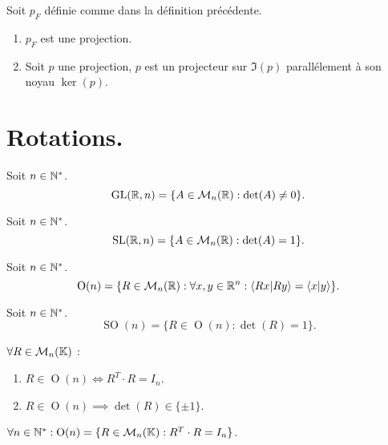 \begin{proposition}
    Soit $p_F$ définie comme dans la définition précédente.
    \begin{enumerate}
        \item $p_F$ est une projection.
        \item Soit $p$ une projection, $p$ est un projecteur sur $\Im(p)$ parallélement à son noyau $\ker(p)$.
    \end{enumerate}
\end{proposition}

\section{Rotations.}
\begin{definition}
	Soit $n \in \mathbb{N}^*$.
    \[ \operatorname{GL}(\mathbb{R}, n) = \{ A \in \mathcal{M}_n(\mathbb{R}) : \det(A) \neq 0 \}. \]
\end{definition}

\begin{definition}
	Soit $n \in \mathbb{N}^*$.
    \[ \operatorname{SL}(\mathbb{R}, n) = \{ A \in \mathcal{M}_n(\mathbb{R}) : \det(A) = 1 \}. \]
\end{definition}

\begin{definition}
	Soit $n \in \mathbb{N}^*$.
    \[ \operatorname{O}(n) = \{ R \in \mathcal{M}_n(\mathbb{R}) : \forall x, y \in \mathbb{R}^n : \langle Rx|Ry \rangle = \langle x|y \rangle \}. \]
\end{definition}

\begin{definition}
    Soit $n \in \mathbb{N}^*$.
    \[ \operatorname{SO}(n) = \{ R \in \operatorname{O}(n) : \det(R) = 1 \}. \]
\end{definition}

\begin{proposition}
	$\forall R \in \mathcal{M}_n(\mathbb{K})$ :
    \begin{enumerate}
        \item $R \in \operatorname{O}(n) \iff R^T \cdot R = I_n$.
        \item $R \in \operatorname{O}(n) \implies \det(R) \in \{ \pm 1 \}$.
    \end{enumerate}
\end{proposition}

\begin{corollary}
	$\forall n \in \mathbb{N}^* : \operatorname{O}(n) = \{ R \in \mathcal{M}_n(\mathbb{K}) : R^T \cdot R = I_n \}$.
\end{corollary}

